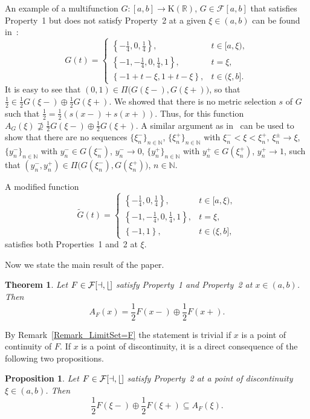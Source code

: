 \documentclass[final,3p,mathptmx]{article}%
\newcommand{\R}{{\mathbb R}}
\newcommand{\N}{{\mathbb N}}
\newcommand{\Pair}[2]{\Pi \big ( {#1},{#2} \big )}
\newcommand{\calF}{\cal{F}[a,b]}
\newtheorem{theorem}[remark]{Theorem}
\newtheorem{propos}[remark]{Proposition}
\begin{document}
{{{An example of a multifunction $G: [a,b] \to {\mathrm{K}(\R)}$, $G \in \mathcal{F}[a,b]$ that satisfies Property~1 but does not satisfy Property~2 at a given $\xi \in (a,b)$ can be found in~\cite[Example~7.4]{BDFM:2021}:
$$
G(t) = \begin{cases}
	\left\{ -\frac{1}{4}, 0, \frac{1}{4} \right\}, & t \in [a,\xi),\\
	\left\{ -1, -\frac{1}{4}, 0, \frac{1}{4}, 1 \right\}, & t = \xi, \\
	\left\{ -1 + t - \xi, 1 + t - \xi \right\}, & t \in (\xi,b].
\end{cases}
$$
It is easy to see that $(0,1) \in \Pair{G(\xi-)}{G(\xi+)}$, so that $\frac{1}{2} \in \frac{1}{2} G(\xi-) \oplus \frac{1}{2} G(\xi+)$. We showed that there is no metric selection $s$ of $G$ such that $\frac{1}{2} = \frac{1}{2}(s(x-) + s(x+))$. Thus,  for this function  $A_G(\xi) \not\supseteq \frac{1}{2} G(\xi-)\oplus \frac{1}{2} G(\xi+)$. A similar argument as in~\cite{BDFM:2021} can be used to show that there are no sequences $\{\xi_n^-\}_{n \in \N}$, $\{\xi_n^+\}_{n \in \N}$ with  $\xi_n^- < \xi < \xi_n^+$, $\xi_n^\pm \to \xi$,  
$\{y_n^-\}_{n \in \N} $ with $y_n^- \in G(\xi_n^-)$, $y_n^- \to 0$,  $\{y_n^+\}_{n \in \N}$ with $y_n^+ \in G(\xi_n^+)$, $y_n^+ \to 1$,  such that $(y_n^-, y_n^+) \in \Pair{G(\xi_n^-)}{G(\xi_n^+)}$, $n \in \N$.

A modified function
$$
\widetilde G(t) = \begin{cases}
	\left\{ -\frac{1}{4}, 0, \frac{1}{4} \right\}, & t \in [a,\xi),\\
	\left\{ -1, -\frac{1}{4}, 0, \frac{1}{4}, 1 \right\}, & t = \xi, \\
	\left\{ -1, 1 \right\}, & t \in (\xi,b],
\end{cases}
$$
satisfies both Properties~1 and~2 at $\xi$.


Now we state the main result of the paper. 

\begin{theorem}\label{Theorem_MainResult}
		Let $F \in \calF$ satisfy Property~1 and Property~2 at $x\in (a,b)$. Then
		$$ 
		A_F(x) = \frac{1}{2} F(x-)\oplus \frac{1}{2} F(x+). 
		$$
\end{theorem}

By Remark~\ref{Remark_LimitSet=F} the statement is trivial if $x$ is a point of continuity of $F$. If $x$ is a point of discontinuity, it is a direct consequence of the following two propositions. 

\begin{propos}\label{Prop_FirstInclusion} 
		Let $F \in \calF$ satisfy Property~2 at a point of discontinuity $\xi \in (a,b)$. Then 
		$$ 
		\frac{1}{2} F(\xi-)\oplus \frac{1}{2} F(\xi+) \subseteq A_F(\xi).
		$$
\end{propos}
	
}}}
\end{document}
